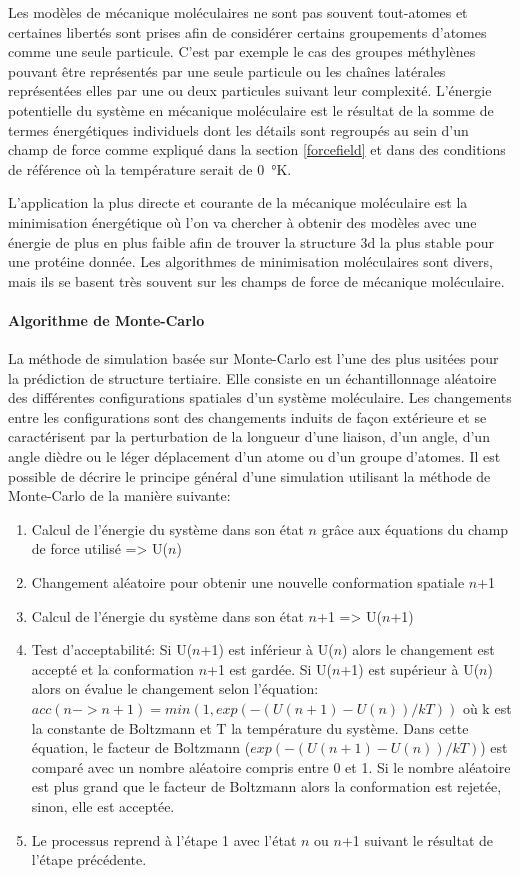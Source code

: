 Les modèles de mécanique moléculaires ne sont pas souvent tout-atomes et certaines libertés sont prises afin de considérer certains groupements d'atomes comme une seule particule. C'est par exemple le cas des groupes méthylènes pouvant être représentés par une seule particule ou les chaînes latérales représentées elles par une ou deux particules suivant leur complexité. L'énergie potentielle du système en mécanique moléculaire est le résultat de la somme de termes énergétiques individuels dont les détails sont regroupés au sein d'un champ de force comme expliqué dans la section \ref{forcefield} et dans des conditions de référence où la température serait de \SI{0}{\degree}K.

L'application la plus directe et courante de la mécanique moléculaire est la minimisation énergétique où l'on va chercher à obtenir des modèles avec une énergie de plus en plus faible afin de trouver la structure 3d la plus stable pour une protéine donnée. Les algorithmes de minimisation moléculaires sont divers, mais ils se basent très souvent sur les champs de force de mécanique moléculaire.


\paragraph{Algorithme de Monte-Carlo}

La méthode de simulation basée sur Monte-Carlo est l'une des plus usitées \cite{metropolis1949monte} pour la prédiction de structure tertiaire. Elle consiste en un échantillonnage aléatoire des différentes configurations spatiales d'un système moléculaire. Les changements entre les configurations sont des changements induits de façon extérieure et se caractérisent par la perturbation de la longueur d'une liaison, d'un angle, d'un angle dièdre ou le léger déplacement d'un atome ou d'un groupe d'atomes. Il est possible de décrire le principe général d'une simulation utilisant la méthode de Monte-Carlo de la manière suivante:

\begin{enumerate}
	\item Calcul de l'énergie du système dans son état $n$ grâce aux équations du champ de force utilisé => U($n$)
	\item Changement aléatoire pour obtenir une nouvelle conformation spatiale $n$+1
	\item Calcul de l'énergie du système dans son état $n$+1 => U($n$+1)
	\item Test d'acceptabilité: 
	Si U($n$+1) est inférieur à U($n$) alors le changement est accepté et la conformation $n$+1 est gardée. 
	Si U($n$+1) est supérieur à U($n$) alors on évalue le changement selon l'équation: $acc(n -> n+1) = min(1, exp(-(U(n+1)-U(n))/kT))$ où k est la constante de Boltzmann et T la température du système. Dans cette équation, le facteur de Boltzmann ($exp(-(U(n+1)-U(n))/kT)$) est comparé avec un nombre aléatoire compris entre 0 et 1. Si le nombre aléatoire est plus grand que le facteur de Boltzmann alors la conformation est rejetée, sinon, elle est acceptée.
	\item Le processus reprend à l'étape 1 avec l'état $n$ ou $n$+1 suivant le résultat de l'étape précédente.
\end{enumerate}

